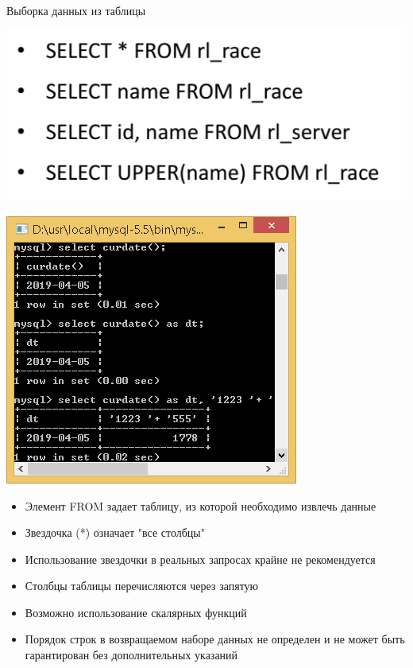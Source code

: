 \documentclass{beamer}
\begin{document}
\begin{frame}{Выборка данных из таблицы}
\begin{minipage}{0.4\textwidth}
  \begin{flushleft}
	\begin{center}
\includegraphics[scale=0.4]{images/SQL-01a.png}
  	\end{center}
	\begin{center}
\includegraphics[scale=0.2]{images/SQL-01.png}
  	\end{center}
  \end{flushleft}  	
\end{minipage}
\begin{minipage}{0.5\textwidth}
  \begin{flushright}
	\begin{itemize}
	\item Элемент FROM задает таблицу, из которой необходимо извлечь данные
	\item Звездочка (*) означает "все столбцы"
	\item Использование звездочки в реальных запросах крайне не рекомендуется
	\item Столбцы таблицы перечисляются через запятую
	\item Возможно использование скалярных функций
	\item Порядок строк в возвращаемом наборе данных не определен и не может быть гарантирован без дополнительных указаний
	\end{itemize}
  \end{flushright}
\end{minipage}
\end{frame}
\end{document}
